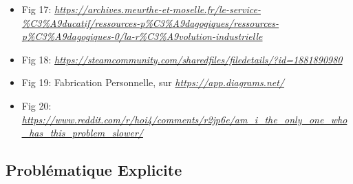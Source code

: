 \documentclass{article}
\begin{document}
\begin{itemize}
                \item Fig 17: \textit{\url{https://archives.meurthe-et-moselle.fr/le-service-\%C3\%A9ducatif/ressources-p\%C3\%A9dagogiques/ressources-p\%C3\%A9dagogiques-0/la-r\%C3\%A9volution-industrielle}}
                \item Fig 18: \textit{\url{https://steamcommunity.com/sharedfiles/filedetails/?id=1881890980}}
                \item Fig 19: Fabrication Personnelle, sur \textit{\url{https://app.diagrams.net/}}
                \item Fig 20: \textit{\url{https://www.reddit.com/r/hoi4/comments/r2jp6e/am_i_the_only_one_who_has_this_problem_slower/}}
            \end{itemize}

    \subsection{Problématique Explicite}
\end{document}
